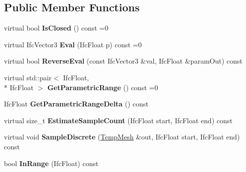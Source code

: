 \subsection*{Public Member Functions}
\begin{DoxyCompactItemize}
\item 
\hypertarget{class_assimp_1_1_i_f_c_1_1_curve_ad9886c29eef15ab6b3638355867dd6f5}{virtual bool {\bfseries Is\+Closed} () const =0}\label{class_assimp_1_1_i_f_c_1_1_curve_ad9886c29eef15ab6b3638355867dd6f5}

\item 
\hypertarget{class_assimp_1_1_i_f_c_1_1_curve_a3112a0b83eaf964439d74e1a501434ec}{virtual Ifc\+Vector3 {\bfseries Eval} (Ifc\+Float p) const =0}\label{class_assimp_1_1_i_f_c_1_1_curve_a3112a0b83eaf964439d74e1a501434ec}

\item 
\hypertarget{class_assimp_1_1_i_f_c_1_1_curve_ae696bdfebc4be5baf46ed130f96b9ab0}{virtual bool {\bfseries Reverse\+Eval} (const Ifc\+Vector3 \&val, Ifc\+Float \&param\+Out) const }\label{class_assimp_1_1_i_f_c_1_1_curve_ae696bdfebc4be5baf46ed130f96b9ab0}

\item 
\hypertarget{class_assimp_1_1_i_f_c_1_1_curve_a9716bca2d6b84dc46d80ecec1ab4c565}{virtual std\+::pair$<$ Ifc\+Float, \\*
Ifc\+Float $>$ {\bfseries Get\+Parametric\+Range} () const =0}\label{class_assimp_1_1_i_f_c_1_1_curve_a9716bca2d6b84dc46d80ecec1ab4c565}

\item 
\hypertarget{class_assimp_1_1_i_f_c_1_1_curve_a7513c1f2b90a1029bde780c57511f844}{Ifc\+Float {\bfseries Get\+Parametric\+Range\+Delta} () const }\label{class_assimp_1_1_i_f_c_1_1_curve_a7513c1f2b90a1029bde780c57511f844}

\item 
\hypertarget{class_assimp_1_1_i_f_c_1_1_curve_a9580c39b62b1faa77af87c6f6a6434de}{virtual size\+\_\+t {\bfseries Estimate\+Sample\+Count} (Ifc\+Float start, Ifc\+Float end) const }\label{class_assimp_1_1_i_f_c_1_1_curve_a9580c39b62b1faa77af87c6f6a6434de}

\item 
\hypertarget{class_assimp_1_1_i_f_c_1_1_curve_ae136786eb56b77b1dc719eb1ebb4a8d8}{virtual void {\bfseries Sample\+Discrete} (\hyperlink{struct_assimp_1_1_i_f_c_1_1_temp_mesh}{Temp\+Mesh} \&out, Ifc\+Float start, Ifc\+Float end) const }\label{class_assimp_1_1_i_f_c_1_1_curve_ae136786eb56b77b1dc719eb1ebb4a8d8}

\item 
\hypertarget{class_assimp_1_1_i_f_c_1_1_curve_aa1fa73c68f939e9de4d67e10531e6024}{bool {\bfseries In\+Range} (Ifc\+Float) const }\label{class_assimp_1_1_i_f_c_1_1_curve_aa1fa73c68f939e9de4d67e10531e6024}

\end{DoxyCompactItemize}
